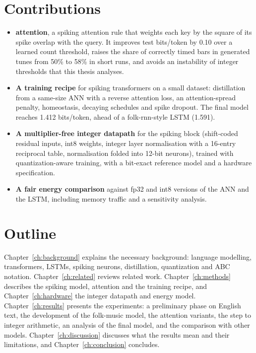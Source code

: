 \section{Contributions}

\begin{itemize}
  \item \textbf{\csq{} attention}, a spiking attention rule that weights each key by the square of its spike
        overlap with the query. It improves test bits/token by 0.10 over a learned count threshold, raises the
        share of correctly timed bars in generated tunes from 50\% to 58\% in short runs, and avoids an
        instability of integer thresholds that this thesis analyses.
  \item \textbf{A training recipe} for spiking transformers on a small dataset: distillation from a same-size
        ANN with a reverse attention loss, an attention-spread penalty, homeostasis, decaying schedules and spike
        dropout. The final model reaches 1.412 bits/token, ahead of a folk-rnn-style LSTM (1.591).
  \item \textbf{A multiplier-free integer datapath} for the spiking block (shift-coded residual inputs, int8
        weights, integer layer normalisation with a 16-entry reciprocal table, normalisation folded into 12-bit
        neurons), trained with quantization-aware training, with a bit-exact reference model and a hardware
        specification.
  \item \textbf{A fair energy comparison} against fp32 and int8 versions of the ANN and the LSTM, including memory
        traffic and a sensitivity analysis.
\end{itemize}

\section{Outline}

Chapter~\ref{ch:background} explains the necessary background: language modelling, transformers, LSTMs, spiking
neurons, distillation, quantization and ABC notation. Chapter~\ref{ch:related} reviews related work.
Chapter~\ref{ch:methods} describes the spiking model, \csq{} attention and the training recipe, and
Chapter~\ref{ch:hardware} the integer datapath and energy model. Chapter~\ref{ch:results} presents the
experiments: a preliminary phase on English text, the development of the folk-music model, the attention
variants, the step to integer arithmetic, an analysis of the final model, and the comparison with other models.
Chapter~\ref{ch:discussion} discusses what the results mean and their limitations, and
Chapter~\ref{ch:conclusion} concludes.

